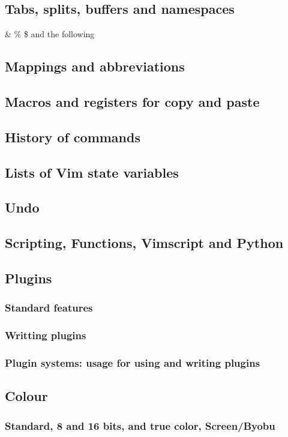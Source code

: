 \documentclass{article}
\begin{document}
\subsection{Tabs, splits, buffers and namespaces}
\& \% \$ and the following
\subsection{Mappings and abbreviations}
\subsection{Macros and registers for copy and paste}
\subsection{History of commands}
\subsection{Lists of Vim state variables}
\subsection{Undo}
\subsection{Scripting, Functions, Vimscript and Python}
\subsection{Plugins}
\subsubsection{Standard features}
\subsubsection{Writting plugins}
\subsubsection{Plugin systems: usage for using and writing plugins}
\subsection{Colour}
\subsubsection{Standard, 8 and 16 bits, and true color, Screen/Byobu}
\end{document}
